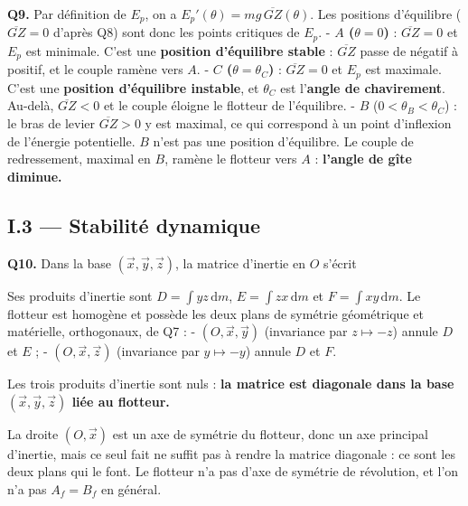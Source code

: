 \documentclass[11pt,a4paper]{article}
\newcommand{\equationajustee}[1]{%
  \sbox{\boiteequation}{$\displaystyle #1$}%
  \ifdim\wd\boiteequation>\linewidth
    \[\resizebox{\linewidth}{!}{\usebox{\boiteequation}}\]%
  \else
    \[#1\]%
  \fi}
\begin{document}
\textbf{Q9.} Par définition de \(E_p\), on a \(E_p'(\theta)=mg\,\overline{GZ}(\theta)\). Les positions d'équilibre (\(\overline{GZ}=0\) d'après Q8) sont donc les points critiques de \(E_p\).
- \textbf{\(A\) (\(\theta=0\))} : \(\overline{GZ}=0\) et \(E_p\) est minimale. C'est une \textbf{position d'équilibre stable} : \(\overline{GZ}\) passe de négatif à positif, et le couple ramène vers \(A\).
- \textbf{\(C\) (\(\theta=\theta_C\))} : \(\overline{GZ}=0\) et \(E_p\) est maximale. C'est une \textbf{position d'équilibre instable}, et \(\theta_C\) est l'\textbf{angle de chavirement}. Au-delà, \(\overline{GZ}<0\) et le couple éloigne le flotteur de l'équilibre.
- \textbf{\(B\)} (\(0<\theta_B<\theta_C\)) : le bras de levier \(\overline{GZ}>0\) y est maximal, ce qui correspond à un point d'inflexion de l'énergie potentielle. \(B\) n'est pas une position d'équilibre. Le couple de redressement, maximal en \(B\), ramène le flotteur vers \(A\) : \textbf{l'angle de gîte diminue.}

\hypertarget{i.3-stabilituxe9-dynamique}{%
\subsection{I.3 --- Stabilité dynamique}\label{i.3-stabilituxe9-dynamique}}

\textbf{Q10.} Dans la base \((\vec x,\vec y,\vec z)\), la matrice d'inertie en \(O\) s'écrit

\equationajustee{\bar{\bar I}_f(O)=\begin{pmatrix}A&-F&-E\\-F&B&-D\\-E&-D&C\end{pmatrix}.}

Ses produits d'inertie sont \(D=\int yz\,\mathrm dm\), \(E=\int zx\,\mathrm dm\) et \(F=\int xy\,\mathrm dm\). Le flotteur est homogène et possède les deux plans de symétrie géométrique et matérielle, orthogonaux, de Q7 :
- \((O,\vec x,\vec y)\) (invariance par \(z\mapsto-z\)) annule \(D\) et \(E\) ;
- \((O,\vec x,\vec z)\) (invariance par \(y\mapsto-y\)) annule \(D\) et \(F\).

Les trois produits d'inertie sont nuls : \textbf{la matrice est diagonale dans la base \((\vec x,\vec y,\vec z)\) liée au flotteur.}

La droite \((O,\vec x)\) est un axe de symétrie du flotteur, donc un axe principal d'inertie, mais ce seul fait ne suffit pas à rendre la matrice diagonale : ce sont les deux plans qui le font. Le flotteur n'a pas d'axe de symétrie de révolution, et l'on n'a pas \(A_f=B_f\) en général.
\end{document}
